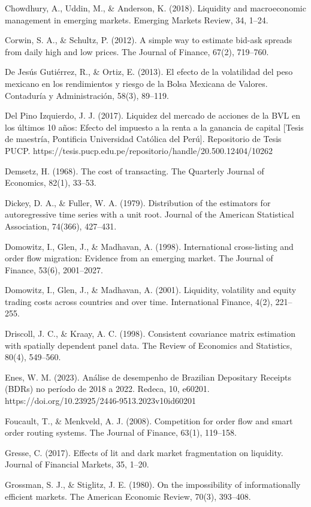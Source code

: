 \begin{referencias}
Chowdhury, A., Uddin, M., \& Anderson, K. (2018). Liquidity and macroeconomic management in emerging markets. Emerging Markets Review, 34, 1--24.

Corwin, S. A., \& Schultz, P. (2012). A simple way to estimate bid-ask spreads from daily high and low prices. The Journal of Finance, 67(2), 719--760.

De Jesús Gutiérrez, R., \& Ortiz, E. (2013). El efecto de la volatilidad del peso mexicano en los rendimientos y riesgo de la Bolsa Mexicana de Valores. Contaduría y Administración, 58(3), 89--119.

Del Pino Izquierdo, J. J. (2017). Liquidez del mercado de acciones de la BVL en los últimos 10 años: Efecto del impuesto a la renta a la ganancia de capital {[}Tesis de maestría, Pontificia Universidad Católica del Perú{]}. Repositorio de Tesis PUCP. https://tesis.pucp.edu.pe/repositorio/handle/20.500.12404/10262

Demsetz, H. (1968). The cost of transacting. The Quarterly Journal of Economics, 82(1), 33--53.

Dickey, D. A., \& Fuller, W. A. (1979). Distribution of the estimators for autoregressive time series with a unit root. Journal of the American Statistical Association, 74(366), 427--431.

Domowitz, I., Glen, J., \& Madhavan, A. (1998). International cross-listing and order flow migration: Evidence from an emerging market. The Journal of Finance, 53(6), 2001--2027.

Domowitz, I., Glen, J., \& Madhavan, A. (2001). Liquidity, volatility and equity trading costs across countries and over time. International Finance, 4(2), 221--255.

Driscoll, J. C., \& Kraay, A. C. (1998). Consistent covariance matrix estimation with spatially dependent panel data. The Review of Economics and Statistics, 80(4), 549--560.

Enes, W. M. (2023). Análise de desempenho de Brazilian Depositary Receipts (BDRs) no período de 2018 a 2022. Redeca, 10, e60201. https://doi.org/10.23925/2446-9513.2023v10id60201

Foucault, T., \& Menkveld, A. J. (2008). Competition for order flow and smart order routing systems. The Journal of Finance, 63(1), 119--158.

Gresse, C. (2017). Effects of lit and dark market fragmentation on liquidity. Journal of Financial Markets, 35, 1--20.

Grossman, S. J., \& Stiglitz, J. E. (1980). On the impossibility of informationally efficient markets. The American Economic Review, 70(3), 393--408.


\end{referencias}
